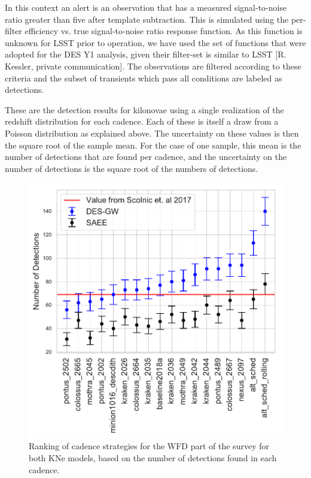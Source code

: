 In this context an alert is an observation that has a measured signal-to-noise ratio greater than five after template subtraction. This is simulated using the per-filter efficiency vs. true signal-to-noise ratio response function. As this function is unknown for LSST prior to operation, we have used the set of functions that were adopted for the DES Y1 analysis, given their filter-set is similar to LSST [R. Kessler, private communication]. The observations are filtered according to these criteria and the subset of transients which pass all conditions are labeled as detections.

These are the detection results for kilonovae using a single realization of the redshift distribution for each cadence. Each of these is itself a draw from a Poisson distribution as explained above. The uncertainty on these values is then the square root of the sample mean. For the case of one sample, this mean is the number of detections that are found per cadence, and the uncertainty on the number of detections is the square root of the numbers of detections.
\begin{figure}[h!]
  \centering
  \includegraphics[scale=0.79]{figures/wfd_detection_counts_by_cadence}
  \caption{Ranking of cadence strategies for the WFD part of the survey for both KNe models, based on the number of detections found in each cadence.}
  \label{fig:cadence_ranking}
\end{figure}
